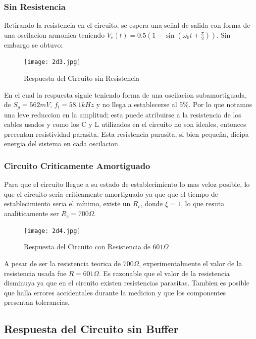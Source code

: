 \subsubsection{Sin Resistencia}\label{dsinresistencia}

Retirando la resistencia en el circuito, se espera una señal de salida con forma de una oscilacion armonica teniendo $V_c(t) = 0.5\left(1-\sin{\left(\omega_0t+\frac{\pi}{2}\right)}\right)$. Sin embargo se obtuvo:

\begin{figure}[h!]
\centering
\texttt{[image: 2d3.jpg]}
\caption{Respuesta del Circuito sin Resistencia} 	
\label{fig:LRC2d3}
\end{figure}

\pagebreak

En el cual la respuesta siguie teniendo forma de una oscilacion subamortiguada, de $S_p = 562mV$, $f_t = 58.1kHz$ y no llega a establecerse al $5\%$. Por lo que notamos una leve reduccion en la amplitud; esta puede atribuirse a la resistencia de los cables usados y como los C y L utilizados en el circuito no son ideales, entonces precentan resistividad  parasita. Esta resistencia  parasita, si bien pequeña, dicipa energia del sistema en cada oscilacion.

\subsubsection{Circuito Criticamente Amortiguado}

Para que el circuito llegue a su estado de establecimiento lo mas veloz posible, lo que el circuito seria criticamente amortiguado ya que que el tiempo de establecimiento seria el mínimo, existe un $R_c$, donde $\xi = 1$, lo que resuta analiticamente ser $R_c = 700\Omega$. 

\begin{figure}[h!]
\centering
\texttt{[image: 2d4.jpg]}
\caption{Respuesta del Circuito con Resistencia de $601\Omega$} 	
\label{fig:LRC2d4}
\end{figure}

A pesar de ser la resistencia teorica de $700\Omega$, experimentalmente el valor de la resistencia usada fue $R = 601\Omega$. Es razonable que el valor de la resistencia disminuya ya que en el circuito existen resistencias parasitas. Tambien es posible que halla errores accidentales durante la medicion y que los componentes presentan tolerancias.

\subsection{Respuesta del Circuito sin Buffer}

